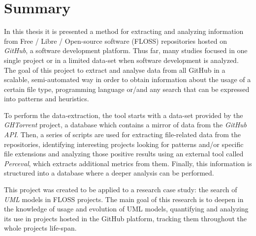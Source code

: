 \documentclass[a4paper, 12pt]{book}
\begin{document}
\chapter*{Summary}
In this thesis it is presented a method for extracting and analyzing information from Free / Libre / Open-source
software (FLOSS) repositories hosted on \emph{GitHub}, a software development platform. Thus far, many studies focused
in one single project or in a limited data-set when software development is analyzed. The goal of this project to
extract and analyse data from all GitHub in a scalable, semi-automated way in order to obtain information about
the usage of a certain file type, programming language or/and any search that can be expressed into patterns and heuristics.\par
To perform the data-extraction, the tool starts with a data-set provided by the \emph{GHTorrent} project,
a database which contains a mirror of data from the \emph{GitHub API}. Then, a series of scripts are
used for extracting file-related data from the repositories, identifying interesting projects looking for patterns and/or
specific file extensions and analyzing those positive results using an external tool called \emph{Perceval},
which extracts additional metrics from them. Finally, this information is structured into a database where a deeper
analysis can be performed.\par
This project was created to be applied to a research case study: the search of \emph{UML} models in FLOSS projects.
The main goal of this research is to deepen in the knowledge of usage and evolution of UML models,
quantifying and analyzing its use in projects hosted in the GitHub platform, tracking them throughout
the whole projects life-span.
\end{document}
